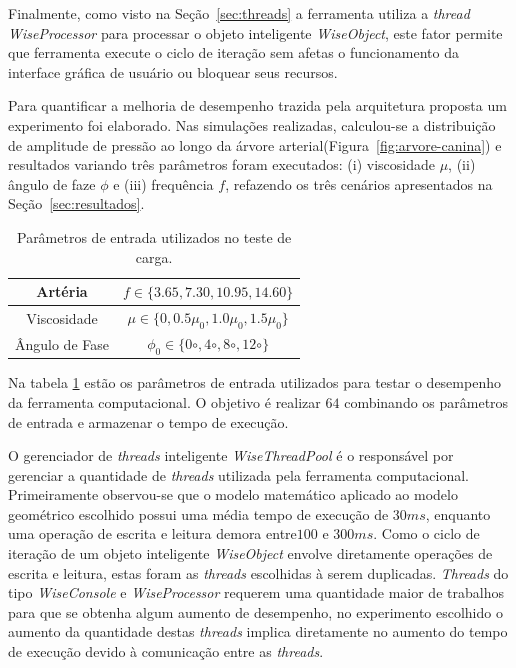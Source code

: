Finalmente, como visto na Seção~\ref{sec:threads} a ferramenta utiliza a \textit{thread} \textit{WiseProcessor} para processar o objeto inteligente \textit{WiseObject}, este fator permite que ferramenta execute o ciclo de iteração sem afetas o funcionamento da interface gráfica de usuário ou bloquear seus recursos.

Para quantificar a melhoria de desempenho trazida pela arquitetura proposta um experimento foi elaborado. Nas simulações realizadas, calculou-se a distribuição de amplitude de pressão ao longo da árvore arterial(Figura~\ref{fig:arvore-canina}) e resultados variando três parâmetros foram executados: (i) viscosidade $\mu$, (ii) ângulo de faze $\phi$ e (iii) frequência $f$, refazendo os três cenários apresentados na Seção~\ref{sec:resultados}.

\begin{table}[!htbp]
	\caption{Parâmetros de entrada utilizados no teste de carga.}
	\centering{}
	\begin{tabular}{c|c}
		\toprule 
		Artéria	& $f \in \{3.65,7.30,10.95,14.60\}$  \\
		\midrule 
		Viscosidade	& $\mu \in \{0,0.5\mu_0,1.0\mu_0,1.5\mu_0\}$    \\ 
		\midrule 
		Ângulo de Fase	& $\phi_0 \in \{0{\circ},4{\circ},8{\circ},12{\circ}\}$  \\ 
		\bottomrule 
	\end{tabular} 
	\label{tab1:entrada}
\end{table}

Na tabela \ref{tab1:entrada} estão os parâmetros de entrada utilizados para testar o desempenho da ferramenta computacional. O objetivo é realizar $64$ combinando os parâmetros de entrada e armazenar o tempo de execução.

O gerenciador de \textit{threads} inteligente \textit{WiseThreadPool} é o responsável por gerenciar a quantidade de \textit{threads} utilizada pela ferramenta computacional. Primeiramente observou-se que o modelo matemático aplicado ao modelo geométrico escolhido possui uma média tempo de execução de $30ms$, enquanto uma operação de escrita e leitura demora entre$100$ e $300ms$. Como o ciclo de iteração de um objeto inteligente \textit{WiseObject} envolve diretamente operações de escrita e leitura, estas foram as \textit{threads} escolhidas à serem duplicadas. \textit{Threads} do tipo \textit{WiseConsole} e \textit{WiseProcessor} requerem uma quantidade maior de trabalhos para que se obtenha algum aumento de desempenho, no experimento escolhido o aumento da quantidade destas \textit{threads} implica diretamente no aumento do tempo de execução devido à comunicação entre as \textit{threads}.

